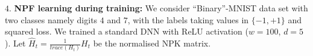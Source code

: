 $4.$ \textbf{NPF learning during training:} We consider ``Binary''-MNIST data set with two classes namely digits $4$ and $7$, with the labels taking values in $\{-1,+1\}$ and squared loss. We trained a standard DNN with ReLU activation ($w=100$, $d=5$). Let $\widehat{H}_t=\frac{1}{trace(H_t)}H_t$ be the normalised NPK matrix. 

